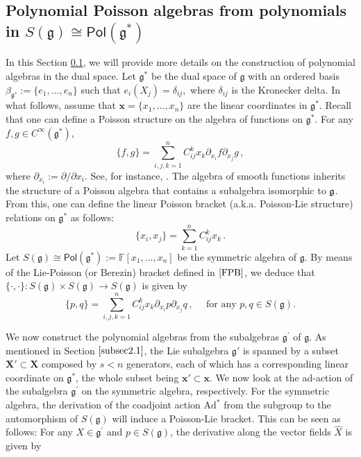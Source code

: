 \documentclass[10pt]{amsart}
\theoremstyle{definition}
\theoremstyle{corollary}
\theoremstyle{remark}
\theoremstyle{conclusion}
\begin{document}
\subsection{Polynomial Poisson algebras from polynomials in $S(\mathsf{\mathfrak{g}})\cong \mathsf{Pol}(\mathfrak{g^*})$}
\label{subsec2.2}

In this Section \ref{subsec2.2}, we will provide more details on the construction of polynomial algebras in the dual space. Let $\mathfrak{g}^*$ be the dual space of $\mathfrak{g}$ with an ordered basis $\beta_{\mathfrak{g}^*} := \{e_1,\ldots,e_n\}$ such that $e_i(X_j) =\delta_{ij},$ where $\delta_{ij}$ is the Kronecker delta. In what follows, assume that $\boldsymbol{x}=\{x_1, \ldots, x_n\}$ are the linear coordinates in $\mathfrak{g}^*$.  Recall that one can define a Poisson structure on the algebra of functions on $\mathfrak{g}^*.$  For any $f,g \in C^\infty(\mathfrak{g}^*)$, 
\begin{equation}
	\{f,g\}=\sum_{i,j,k=1}^n C_{ij}^k x_k \partial_{x_i} f \partial_{x_j} g  \, ,
	\label{FPB}
\end{equation} where $\partial_{x_i} := \partial/\partial x_i.$ See, for instance, \cite{MR2906391}.  The algebra of smooth functions inherits the structure of a Poisson algebra that contains a subalgebra isomorphic to $\frak{g}$.  From this, one can define the linear Poisson bracket (a.k.a. Poisson-Lie structure) relations on $\mathfrak{g}^*$ as follows:
\begin{equation}
	\{x_i,x_j\}= \sum_{k=1}^nC_{ij}^k x_k  \, .
	\label{xcoord}
\end{equation} 
Let $S(\mathfrak{g}) \cong \textsf{Pol}(\mathfrak{g}^*):=\mathbb{F}\left[ x_{1},\ldots ,x_{n}\right]$ be the symmetric algebra of $\mathfrak{g}.$  By means of the Lie-Poisson (or Berezin) bracket defined in $\eqref{FPB}$, we deduce that $\{\cdot,\cdot\} :S(\mathfrak{g}) \times S(\mathfrak{g}) \rightarrow S(\mathfrak{g})$ is given by
\begin{equation}
	\{p,q\}= \sum_{i,j,k =1}^n C_{ij}^k x_k \partial_{x_i} p\partial_{x_j} q  \, , \quad \text{ for any } p,q \in S(\mathfrak{g}).
	\label{LPB}
\end{equation}



 We now construct the polynomial algebras from the subalgebras $\mathfrak{g}^\prime$ of $\mathfrak{g}$. As mentioned in Section $\ref{subsec2.1}$, the Lie subalgebra $\mathfrak{g}'$ is spanned by a subset $\boldsymbol{X}' \subset \boldsymbol{X}$ composed by $s<n$ generators, each of which has a corresponding linear coordinate on $\mathfrak{g^*}$, the whole subset being $\boldsymbol{x}' \subset \boldsymbol{x}$. We now look at the ad-action of the subalgebra $\mathfrak{g}^\prime$ on the symmetric algebra, respectively. For the symmetric algebra, the derivation of the coadjoint action $\mathrm{Ad}^*$ from the subgroup to the automorphism of $S(\mathfrak{g})$ will induce a Poisson-Lie bracket. This can be seen as follows: For any $X \in \mathfrak{g}^\prime$ and $p \in S(\mathfrak{g})$,  the derivative along the vector fields $\hat{X}$ is given by
 
\end{document}
